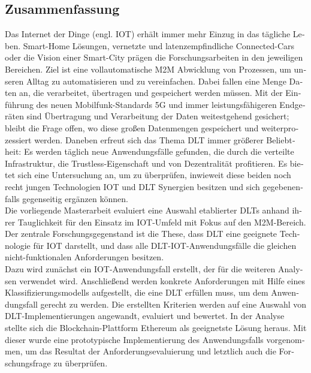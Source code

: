 \begin{otherlanguage}{ngerman}
	\chapter*{Zusammenfassung}
	Das Internet der Dinge (engl. \acf{IOT}) erhält immer mehr Einzug in das tägliche Leben. Smart-Home Lösungen, vernetzte und latenzempfindliche Connected-Cars oder die Vision einer Smart-City prägen die Forschungsarbeiten in den jeweiligen Bereichen. Ziel ist eine vollautomatische \acf{M2M} Abwicklung von Prozessen, um unseren Alltag zu automatisieren und zu vereinfachen. Dabei fallen eine Menge Daten an, die verarbeitet, übertragen und gespeichert werden müssen. Mit der Einführung des neuen Mobilfunk-Standards 5G und immer leistungsfähigeren Endgeräten sind Übertragung und Verarbeitung der Daten weitestgehend gesichert; bleibt die Frage offen, wo diese großen Datenmengen gespeichert und weiterprozessiert werden.
	Daneben erfreut sich das Thema \acf{DLT} immer größerer Beliebtheit: Es werden täglich neue Anwendungsfälle gefunden, die durch die verteilte Infrastruktur, die Trustless-Eigenschaft und von Dezentralität profitieren. Es bietet sich eine Untersuchung an, um zu überprüfen, inwieweit diese beiden noch recht jungen Technologien \ac{IOT} und \ac{DLT} Synergien besitzen und sich gegebenenfalls gegenseitig ergänzen können.\\
	Die vorliegende Masterarbeit evaluiert eine Auswahl etablierter \acp{DLT} anhand ihrer Tauglichkeit für den Einsatz im \ac{IOT}-Umfeld mit Fokus auf den M2M-Bereich. Der zentrale Forschungsgegenstand ist die These, dass \ac{DLT} eine geeignete Technologie für \ac{IOT} darstellt, und dass alle \ac{DLT}-\ac{IOT}-Anwendungsfälle die gleichen nicht-funktionalen Anforderungen besitzen.\\
	Dazu wird zunächst ein \ac{IOT}-Anwendungsfall erstellt, der für die weiteren Analysen verwendet wird. Anschließend werden konkrete Anforderungen mit Hilfe eines Klassifizierungsmodells aufgestellt, die eine \ac{DLT} erfüllen muss, um dem Anwendungsfall gerecht zu werden. Die erstellten Kriterien werden auf eine Auswahl von \ac{DLT}-Implementierungen angewandt, evaluiert und bewertet. In der Analyse stellte sich die Blockchain-Plattform Ethereum als geeignetste Lösung heraus. Mit dieser wurde eine prototypische Implementierung des Anwendungsfalls vorgenommen, um das Resultat der Anforderungsevaluierung und letztlich auch die Forschungsfrage zu überprüfen.\\

\end{otherlanguage}
